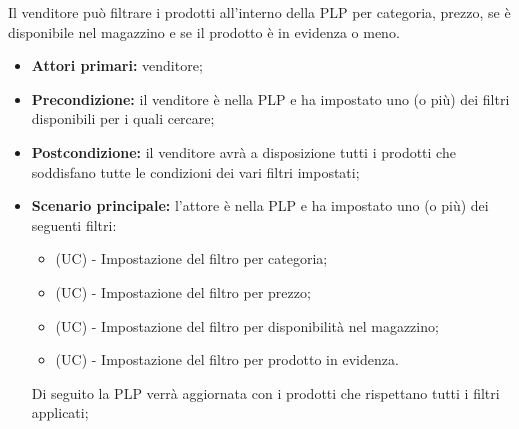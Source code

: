 Il venditore può filtrare i prodotti all'interno della PLP per categoria, prezzo, se è disponibile nel magazzino e se il prodotto è in evidenza o meno.
\begin{itemize}
	\item \textbf{Attori primari:} venditore;
	\item \textbf{Precondizione:} il venditore è nella PLP e ha impostato uno (o più) dei filtri disponibili per i quali cercare;
	\item \textbf{Postcondizione:} il venditore avrà a disposizione tutti i prodotti che soddisfano tutte le condizioni dei vari filtri impostati;
	\item \textbf{Scenario principale:} l'attore è nella PLP e ha impostato uno (o più) dei seguenti filtri:
	\begin{itemize}
		\item (UC) - Impostazione del filtro per categoria;
		\item (UC) - Impostazione del filtro per prezzo;
		\item (UC) - Impostazione del filtro per disponibilità nel magazzino;
		\item (UC) - Impostazione del filtro per prodotto in evidenza.
	\end{itemize}
	Di seguito la PLP verrà aggiornata con i prodotti che rispettano tutti i filtri applicati;
\end{itemize}

